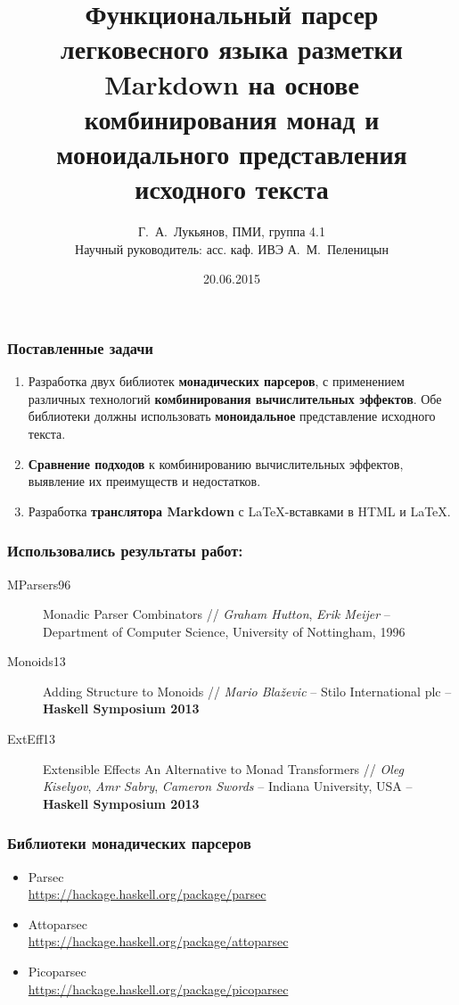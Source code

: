 \documentclass[12pt, compress, t]{beamer}
\title{Функциональный парсер легковесного языка разметки Markdown
на основе комбинирования монад и моноидального представления исходного текста}
\date{20.06.2015}
\author{Г.~А.~Лукьянов, ПМИ, группа 4.1 \\{Научный руководитель: асс. каф. ИВЭ А.~М.~Пеленицын}}
\institute{Институт математики, механики и компьютерных наук ЮФУ}
\begin{document}
\maketitle

\begin{frame}[fragile]
  \frametitle{Поставленные задачи}
  \begin{enumerate}
    \item Разработка двух библиотек \textbf{монадических парсеров}, 
    с применением различных технологий \textbf{комбинирования вычислительных 
    эффектов}. Обе библиотеки должны использовать \textbf{моноидальное}
    представление исходного текста.
    \item \textbf{Сравнение подходов} к комбинированию вычислительных эффектов, выявление их преимуществ и недостатков.
    \item Разработка \textbf{транслятора Markdown} с \LaTeX-вставками в HTML и \LaTeX.
  \end{enumerate}
\end{frame}

\begin{frame}[fragile]
  \frametitle{Использовались результаты работ: }
  \begin{description}
    \item [MParsers96]
    Monadic Parser Combinators // \textit{Graham Hutton}, \textit{Erik Meijer} –
Department of Computer Science, University of Nottingham, 1996
    \item [Monoids13]
    Adding Structure to Monoids // \textit{Mario Blaževic} – Stilo International plc – \\\textbf{Haskell Symposium 2013}
    \item [ExtEff13] 
    Extensible Effects An Alternative to Monad Transformers // \textit{Oleg
Kiselyov}, \textit{Amr Sabry}, \textit{Cameron Swords} – Indiana University, USA – \textbf{Haskell Symposium 2013}
  \end{description}
\end{frame}

\begin{frame}[fragile]
  \frametitle{Библиотеки монадических парсеров}
  \begin{itemize}
    \setlength\itemsep{2em}
    \item[] {\Large{Parsec}} \\
      \footnotesize{\url{https://hackage.haskell.org/package/parsec}}
    \item[] {\Large{Attoparsec}} \\
      \footnotesize{\url{https://hackage.haskell.org/package/attoparsec}}
    \item[] {\Large{Picoparsec}} \\
      \footnotesize{\url{https://hackage.haskell.org/package/picoparsec}}
  \end{itemize}
\end{frame}
\end{document}
